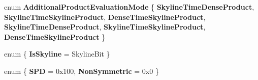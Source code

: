 \begin{DoxyCompactItemize}
\mbox{\label{namespace_eigen_a23b8fa1446cf8ebdf8901a0644e8dd42}} 
enum {\bfseries Additional\+Product\+Evaluation\+Mode} \{ \newline
{\bfseries Skyline\+Time\+Dense\+Product}, 
{\bfseries Skyline\+Time\+Skyline\+Product}, 
{\bfseries Dense\+Time\+Skyline\+Product}, 
{\bfseries Skyline\+Time\+Dense\+Product}, 
\newline
{\bfseries Skyline\+Time\+Skyline\+Product}, 
{\bfseries Dense\+Time\+Skyline\+Product}
 \}
\item 
\mbox{\label{namespace_eigen_a7136e01652485c6a8d5e66f28e5d791c}} 
enum \{ {\bfseries Is\+Skyline} = Skyline\+Bit
 \}
\item 
\mbox{\label{namespace_eigen_a52e1ecd786b086e4f2e632900f342284}} 
enum \{ {\bfseries S\+PD} = 0x100, 
{\bfseries Non\+Symmetric} = 0x0
 \}
\end{DoxyCompactItemize}

